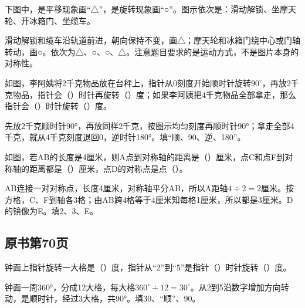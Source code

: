 下图中，是平移现象画“△”，是旋转现象画“○”。图示依次是：滑动解锁、坐摩天轮、开冰箱门、坐缆车。\par
{}
\begin{BookAnswer}
滑动解锁和缆车沿轨道前进，朝向保持不变，画△；摩天轮和冰箱门绕中心或门轴转动，画○。依次为△、○、○、△。注意题目要求的是运动方式，不是图片本身的对称性。
\end{BookAnswer}

如图，李阿姨将2千克物品放在台秤上，指针从0刻度开始顺时针旋转\(90^\circ\)，再放2千克物品，指针会（\hspace{1.8em}）时针再旋转（\hspace{1.8em}）度；如果李阿姨把4千克物品全部拿走，那么指针会（\hspace{1.8em}）时针旋转（\hspace{1.8em}）度。\par
{}
\begin{BookAnswer}
先放2千克顺时针90°，再放同样2千克，按图示均匀刻度再顺时针90°；拿走全部4千克，就从4千克刻度退回0，逆时针180°。填“顺、90、逆、180”。
\end{BookAnswer}

如图，若AB的长度是4厘米，则A点到对称轴的距离是（\hspace{1.8em}）厘米，点C和点F到对称轴的距离都是（\hspace{1.8em}）厘米，点D的对称点是点（\hspace{1.8em}）。\par
{}
\begin{BookAnswer}
AB连接一对对称点，长度4厘米，对称轴平分AB，所以A距轴\(4\div2=2\)厘米。按方格，C、F到轴各3格；由AB跨4格等于4厘米知每格1厘米，所以都是3厘米。D的镜像为E。填2、3、E。
\end{BookAnswer}



\subsection*{原书第70页}

钟面上指针旋转一大格是（\hspace{1.8em}）度，指针从“2”到“5”是指针（\hspace{1.8em}）时针旋转（\hspace{1.8em}）度。\par
\begin{BookAnswer}
钟面一周360°，分成12大格，每大格\(360^\circ\div12=30^\circ\)。从2到5沿数字增加方向转动，是顺时针，经过3大格，共90°。填30、“顺”、90。
\end{BookAnswer}

